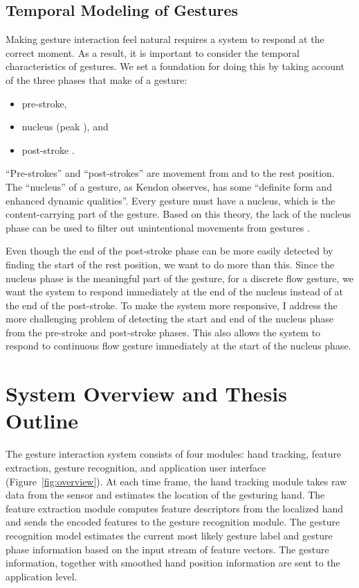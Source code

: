 \subsection{Temporal Modeling of Gestures}
Making gesture interaction feel natural requires a system to respond at the
correct moment. As a result, it is important to consider the temporal
characteristics of gestures. We set a foundation for doing this by taking
account of the three phases that make of a gesture:
\begin{itemize}
  \item pre-stroke,
  \item nucleus (peak \cite{mcneill82}), and
  \item post-stroke \cite{Pavlovic97}.
\end{itemize}
``Pre-strokes'' and ``post-strokes'' are movement from and to the
rest position. The ``nucleus'' of a gesture,
as Kendon \cite{kendon86} observes, has some ``definite form and enhanced dynamic
qualities''. Every gesture must have a nucleus, which is the content-carrying
part of the gesture. Based on this theory, the lack of the nucleus phase can
be used to filter out unintentional movements from gestures .

Even though the end of the
post-stroke phase can be more easily detected by finding the start of the
rest position, we want to do more than this. Since the nucleus phase is the
meaningful part of the gesture, for a discrete flow gesture, we want the system to respond immediately at the end of the nucleus
 instead of at the end of the post-stroke. To make the system more responsive,
I address the more challenging problem of detecting the start and end of the
 nucleus phase from the pre-stroke and post-stroke phases. This also allows the system to respond to continuous
flow gesture immediately at the start of the nucleus phase.

\section{System Overview and Thesis Outline}
The gesture interaction system consists of four modules: hand tracking, 
feature extraction, gesture recognition, and application user interface
(Figure~\ref{fig:overview}). At each time frame, the
hand tracking module takes raw data from the sensor and estimates the location
of the gesturing hand. The feature extraction module computes feature
descriptors from the localized hand and sends the encoded features to the
gesture recognition module.
The gesture recognition model estimates the current most likely gesture label and gesture phase information based on the input stream of
feature vectors. The gesture information, 
together with smoothed hand position information are sent to the application
level. 

